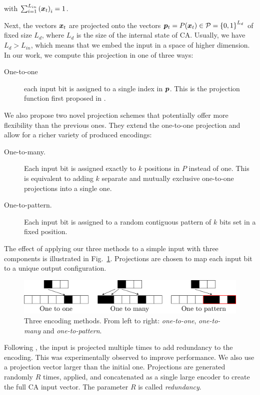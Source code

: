 with
$\sum_{i = 1}^{L_{in}}{({\bm{x}}_{t})}_{i} = 1$.

Next, the vectors ${\bm{x}}_{t}$ are projected onto the vectors
${\bm{p}}_{t} = P({\bm{x}}_{t}) \in \mathcal{P} = {\{0, 1\}}^{L_{d}}$ of fixed size $L_{d}$, where
$L_{d}$ is the size of the internal state of \ac{CA}. Usually, we have
$L_{d} > L_{in}$, which means that we embed the input in a space of higher
dimension. In our work, we compute this projection in one of three ways:

\begin{description}
  \item[One-to-one] each input bit is assigned to a single index in ${\bm{p}}$.
        This is the projection function first proposed in
        \textcite{yilmazReservoirComputingUsing2014}.
\end{description}

We also propose two novel projection schemes that potentially offer more
flexibility than the previous ones. They extend the one-to-one projection and
allow for a richer variety of produced encodings:

\begin{description}
  \item[One-to-many.] Each input bit is assigned exactly to $k$ positions in $P$
        instead of one. This is equivalent to adding $k$ separate and mutually
        exclusive one-to-one projections into a single one.
  \item[One-to-pattern.] Each input bit is assigned to a random contiguous pattern
        of $k$ bits set in a fixed position.
\end{description}

The effect of applying our three methods to a simple input with three components
is illustrated in Fig.~\ref{fig:enc_meth}. Projections are chosen to map
each input bit to a unique output configuration.

\begin{figure}[htbp]
  \centering
  \includegraphics[width=\linewidth]{figures/encoding_methods.pdf}
  \caption{Three encoding methods. From left to right: \emph{one-to-one},
    \emph{one-to-many} and \emph{one-to-pattern}.}\label{fig:enc_meth}
\end{figure}

Following \parencite{yilmazReservoirComputingUsing2014,
  nicheleReservoirComputingUsing2017, nicheleDeepLearningCellular2017}, the
input is projected multiple times to add redundancy to the encoding. This was
experimentally observed to improve performance. We also use a projection vector
larger than the initial one. Projections are generated randomly $R$ times, applied, and concatenated as a single large encoder to create the full \ac{CA} input
vector. The parameter $R$ is called \emph{redundancy}.

